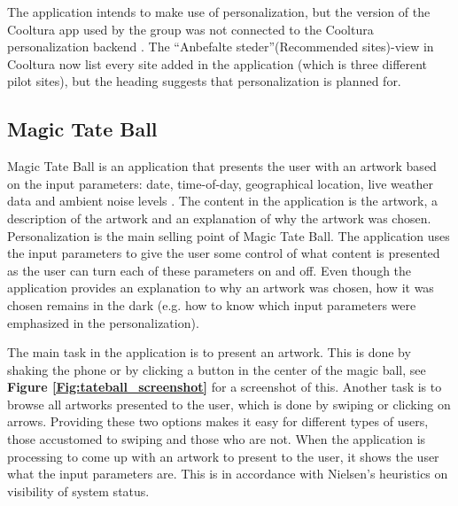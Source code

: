 The application intends to make use of personalization, but the version of the Cooltura app used by the group was not connected to the Cooltura personalization backend \cite{AS4}. The “Anbefalte steder”(Recommended sites)-view in Cooltura now list every site added in the application (which is three different pilot sites), but the heading suggests that personalization is planned for. 

\subsection{Magic Tate Ball}

Magic Tate Ball is an application that presents the user with an artwork based on the input parameters: date, time-of-day, geographical location, live weather data and ambient noise levels \cite{AS5}. The content in the application is the artwork, a description of the artwork and an explanation of why the artwork was chosen. Personalization is the main selling point of Magic Tate Ball. The application uses the input parameters to give the user some control of what content is presented as the user can turn each of these parameters on and off. Even though the application provides an explanation to why an artwork was chosen, how it was chosen remains in the dark (e.g. how to know which input parameters were emphasized in the personalization).\newline


The main task in the application is to present an artwork. This is done by shaking the phone or by clicking a button in the center of the magic ball, see \textbf{Figure \ref{Fig:tateball_screenshot}} for a screenshot of this. Another task is to browse all artworks presented to the user, which is done by swiping or clicking on arrows. Providing these two options makes it easy for different types of users, those accustomed to swiping and those who are not. When the application is processing to come up with an artwork to present to the user, it shows the user what the input parameters are. This is in accordance with Nielsen's heuristics on visibility of system status. \newline

\cleardoublepage